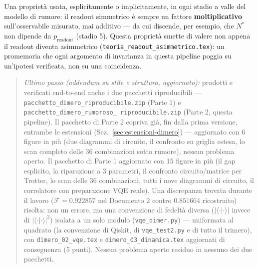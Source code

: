 \documentclass[11pt,a4paper]{article}
\begin{document}
Una proprietà usata, esplicitamente o implicitamente, in ogni stadio a
valle del modello di rumore: il readout simmetrico è sempre un fattore
\textbf{moltiplicativo} sull'osservabile misurato, mai additivo --- da
cui discende, per esempio, che $N^*$ non dipende da $p_\text{readout}$
(stadio 5). Questa proprietà smette di valere non appena il readout
diventa asimmetrico (\texttt{teoria\_readout\_\allowbreak asimmetrico.tex}): un
promemoria che ogni argomento di invarianza in questa pipeline poggia su
un'ipotesi verificata, non su una coincidenza.

\begin{quote}
\textit{Ultimo passo (addendum su stile e struttura, aggiornato):}
prodotti e verificati end-to-end anche i due pacchetti riproducibili ---
\texttt{pacchetto\_dimero\_\allowbreak riproducibile.zip} (Parte 1) e
\texttt{pacchetto\_dimero\_\allowbreak rumoroso\_\allowbreak
riproducibile.zip} (Parte 2, questa pipeline). Il pacchetto di Parte 2
copriva già, fin dalla prima versione, entrambe le estensioni
(Sez.~\ref{sec:estensioni-dimero}) --- aggiornato con 6 figure in più
(due diagrammi di circuito, il confronto su griglia estesa, lo scan
completo delle 36 combinazioni sotto rumore), nessun problema aperto.
Il pacchetto di Parte 1 aggiornato con 15 figure in più (il gap
esplicito, la riparazione a 3 parametri, il confronto circuito/matrice
per Trotter, lo scan delle 36 combinazioni, tutti i nove diagrammi di
circuito, il correlatore con preparazione VQE reale). Una discrepanza
trovata durante il lavoro ($\mathcal F=0.922857$ nel Documento 2 contro
$0.851664$ ricostruito) risolta: non un errore, ma una convenzione di
fedeltà diversa ($\lvert\langle\cdot\rvert\cdot\rangle\rvert$ invece di
$\lvert\langle\cdot\rvert\cdot\rangle\rvert^2$) isolata a un solo modulo
(\texttt{vqe\_dimer.py}) --- uniformata al quadrato (la convenzione di
Qiskit, di \texttt{vqe\_test2.py} e di tutto il trimero), con
\texttt{dimero\_02\_vqe.tex} e \texttt{dimero\_03\_dinamica.tex}
aggiornati di conseguenza (5 punti). Nessun problema aperto residuo in
nessuno dei due pacchetti.
\end{quote}
\end{document}
